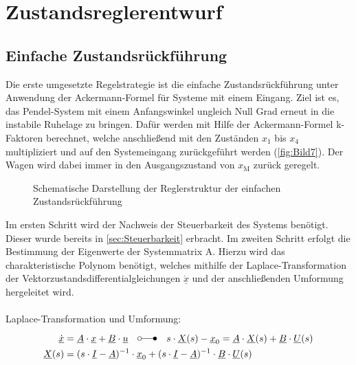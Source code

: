\section{Zustandsreglerentwurf} \label{sec:Zustandsreglerentwurf}

\subsection{Einfache Zustandsrückführung} \label{sec:Ackermann-Formel}

Die erste umgesetzte Regelstrategie ist die einfache Zustandsrückführung unter Anwendung der Ackermann-Formel für Systeme mit einem Eingang. Ziel ist es, das Pendel-System mit einem Anfangswinkel ungleich Null Grad erneut in die instabile Ruhelage zu bringen. Dafür werden mit Hilfe der Ackermann-Formel k-Faktoren berechnet, welche anschließend mit den Zuständen $x_{\mathrm{1}}$ bis $x_{\mathrm{4}}$ multipliziert und auf den Systemeingang zurückgeführt werden (\autoref{fig:Bild7}). Der Wagen wird dabei immer in den Ausgangszustand von $x_{\mathrm{M}}$ zurück geregelt.

\begin{figure}[H]
    \centering
    \caption[Reglerstruktur einfache Zustandsrückführung]{Schematische Darstellung der Reglerstruktur der einfachen Zustandsrückführung}
    \label{fig:Bild7}
\end{figure}

Im ersten Schritt wird der Nachweis der Steuerbarkeit des Systems benötigt. Dieser wurde bereits in \autoref{sec:Steuerbarkeit} erbracht.
Im zweiten Schritt erfolgt die Bestimmung der Eigenwerte der Systemmatrix A. Hierzu wird das charakteristische Polynom benötigt, welches mithilfe der Laplace-Transformation der Vektorzustandsdifferentialgleichungen $\underline{\dot{x}}$ und der anschließenden Umformung hergeleitet wird.\\\\
Laplace-Transformation und Umformung:
\begin{align*}
    \underline{\dot{x}} &= \underline{A}\cdot\underline{x}+\underline{B}\cdot\underline{u}\quad\laplace \quad s\cdot \underline{X}(s)-\underline{x}_{\mathrm{0}}=\underline{A}\cdot \underline{X}(s)+\underline{B}\cdot \underline{U}(s) \\
    \underline{X}(s) &= (s\cdot \underline{I} - \underline{A})^{-1}\cdot\underline{x}_{\mathrm{0}}+(s\cdot \underline{I} - \underline{A})^{-1}\cdot\underline{B}\cdot\underline{U}(s)
\end{align*}

